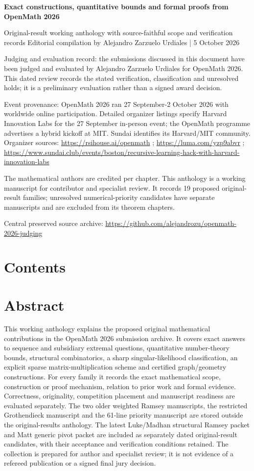 \documentclass[11pt,a4paper]{article}
\begin{document}
{\LARGE\bfseries Exact constructions, quantitative bounds and formal proofs from OpenMath 2026\par}\medskip
{\small Original-result working anthology with source-faithful scope and verification records
Editorial compilation by Alejandro Zarzuelo Urdiales | 5 October 2026\par}\medskip
{\small Judging and evaluation record: the submissions discussed in this document have been judged and evaluated by Alejandro Zarzuelo Urdiales for OpenMath 2026. This dated review records the stated verification, classification and unresolved holds; it is a preliminary evaluation rather than a signed award decision.\par}

{\small Event provenance: OpenMath 2026 ran 27 September-2 October 2026 with worldwide online participation. Detailed organizer listings specify Harvard Innovation Labs for the 27 September in-person event; the OpenMath programme advertises a hybrid kickoff at MIT. Sundai identifies its Harvard/MIT community. Organizer sources: \url{https://rsihouse.ai/openmath} ; \url{https://luma.com/yzp9abvr} ; \url{https://www.sundai.club/events/boston/recursive-learning-hack-with-harvard-innovation-labs}\par}

The mathematical authors are credited per chapter. This anthology is a working manuscript for contributor and specialist review. It records 19 proposed original-result families; unresolved numerical-priority candidates have separate manuscripts and are excluded from its theorem chapters.

Central preserved source archive: \url{https://github.com/alejandrozu/openmath-2026-judging}

\clearpage
\section{Contents}
\tableofcontents
\section{Abstract}
This working anthology explains the proposed original mathematical contributions in the OpenMath 2026 submission archive. It covers exact answers to sequence and subsidiary extremal questions, quantitative number-theory bounds, structural combinatorics, a sharp singular-likelihood classification, an explicit sparse matrix-multiplication scheme and certified graph/geometry constructions. For every family it records the exact mathematical scope, construction or proof mechanism, relation to prior work and formal evidence. Correctness, originality, competition placement and manuscript readiness are evaluated separately. The two older weighted Ramsey manuscripts, the restricted Grothendieck manuscript and the 61-line priority manuscript are stored outside the original-results anthology. The latest Luke/Madhan structural Ramsey packet and Matt generic pivot packet are included as separately dated original-result candidates, with their acceptance and verification conditions retained. The collection is prepared for author and specialist review; it is not evidence of a refereed publication or a signed final jury decision.
\end{document}
